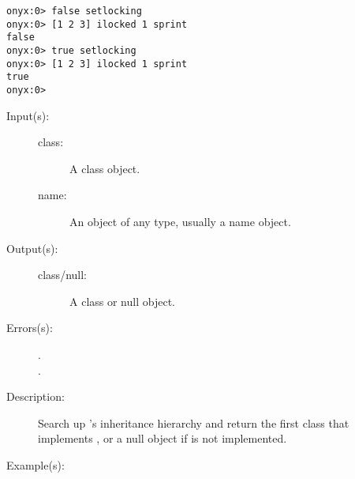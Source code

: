\begin{description}
\begin{description}
\begin{verbatim}
onyx:0> false setlocking
onyx:0> [1 2 3] ilocked 1 sprint
false
onyx:0> true setlocking
onyx:0> [1 2 3] ilocked 1 sprint
true
onyx:0>
		\end{verbatim}
	\end{description}
\label{systemdict:implementor}
\item[{\onyxop{class name}{implementor}{class/null}}: ]
	\begin{description}\item[]
	\item[Input(s): ]
		\begin{description}\item[]
		\item[class: ]
			A class object.
		\item[name: ]
			An object of any type, usually a name object.
		\end{description}
	\item[Output(s): ]
		\begin{description}\item[]
		\item[class/null: ]
			A class or null object.
		\end{description}
	\item[Errors(s): ]
		\begin{description}\item[]
		\item[.]
		\item[.]
		\end{description}
	\item[Description: ]
		Search up 's inheritance hierarchy and return the
		first class that implements , or a null object if
		 is not implemented.
	\item[Example(s): ]\begin{verbatim}


\end{verbatim}
\end{description}
\end{description}
